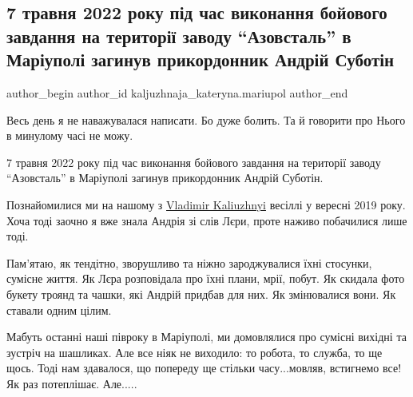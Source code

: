  
 
 
 
 

\subsection{7 травня 2022 року під час виконання бойового завдання на території заводу \enquote{Азовсталь} в Маріуполі загинув прикордонник Андрій Суботін}
\label{sec:08_05_2023.fb.kaljuzhnaja_kateryna.mariupol.1.smert_prykordonnyk_azovstal_andrij_subotin}

\ifcmt
 author_begin
   author_id kaljuzhnaja_kateryna.mariupol
 author_end
\fi

Весь день я не наважувалася написати. Бо дуже болить.  Та й говорити про Нього
в минулому часі не можу.

7 травня 2022 року під час виконання бойового завдання на території заводу
\enquote{Азовсталь} в Маріуполі загинув прикордонник Андрій Суботін. 

Познайомилися ми на нашому з \href{https://www.facebook.com/vladimir.kaliuzhnyi.56}{Vladimir Kaliuzhnyi} весіллі у вересні 2019 року.
Хоча тоді заочно я вже знала Андрія зі слів Лєри, проте  наживо побачилися лише
тоді. 


Пам'ятаю, як тендітно, зворушливо та ніжно  зароджувалися їхні стосунки,
сумісне життя. Як Лєра розповідала про їхні плани, мрії, побут. Як скидала фото
букету троянд та чашки, які Андрій придбав для них. Як змінювалися вони. Як
ставали одним цілим. 

Мабуть останні наші півроку в Маріуполі, ми домовлялися про сумісні вихідні та
зустріч на шашликах. Але все ніяк не виходило: то робота, то служба, то ще
щось. Тоді нам здавалося, що попереду ще стільки часу...мовляв, встигнемо все!
Як раз потеплішає. Але.....


